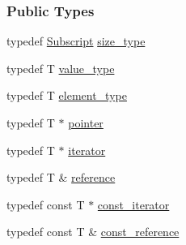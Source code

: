 \subsubsection*{Public Types}
\begin{DoxyCompactItemize}
\item 
typedef \hyperlink{namespace_t_n_t_af22e3f1460e145c04ce4e7d701e4c1c1}{Subscript} \hyperlink{class_t_n_t_1_1_fortran___sparse___vector_afd4ab025a14d99715f114fa610d851f3}{size\_\-type}
\item 
typedef T \hyperlink{class_t_n_t_1_1_fortran___sparse___vector_ada789673672935f4e2b5a3f21d4d0c6d}{value\_\-type}
\item 
typedef T \hyperlink{class_t_n_t_1_1_fortran___sparse___vector_ac62daa559e30981515643d0b35ff9c16}{element\_\-type}
\item 
typedef T $\ast$ \hyperlink{class_t_n_t_1_1_fortran___sparse___vector_a2f899a23b5f4a573eaea47d97fcbf48b}{pointer}
\item 
typedef T $\ast$ \hyperlink{class_t_n_t_1_1_fortran___sparse___vector_a6ef1e42eef916625b75b1f4d77542059}{iterator}
\item 
typedef T \& \hyperlink{class_t_n_t_1_1_fortran___sparse___vector_a4b6fe1d395c3b4c853ff15420cf7fa99}{reference}
\item 
typedef const T $\ast$ \hyperlink{class_t_n_t_1_1_fortran___sparse___vector_abc6533e965e4f1c9a0706ef9dde351a9}{const\_\-iterator}
\item 
typedef const T \& \hyperlink{class_t_n_t_1_1_fortran___sparse___vector_aa734079fe78b7727c780491b0a1a8b3c}{const\_\-reference}
\end{DoxyCompactItemize}
